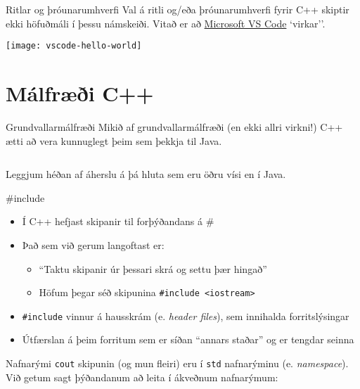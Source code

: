 \documentclass[handout]{beamer}
\begin{document}
\begin{frame}{Ritlar og þróunarumhverfi}
    Val á ritli og/eða þróunarumhverfi fyrir C++ skiptir ekki höfuðmáli í þessu námskeiði. Vitað er að \href{https://code.visualstudio.com/}{Microsoft VS Code} `virkar''.

    \begin{center}
        \texttt{[image: vscode-hello-world]}
    \end{center}
\end{frame}

\section{Málfræði C++}

\begin{frame}[fragile]{Grundvallarmálfræði}
Mikið af grundvallarmálfræði (en ekki allri virkni!) C++ ætti að vera kunnuglegt þeim sem þekkja til Java.
\begin{columns}
\end{columns}
Leggjum héðan af áherslu á þá hluta sem eru öðru vísi en í Java.
\end{frame}

\begin{frame}{\#include}
\begin{itemize}
    \item Í C++ hefjast skipanir til forþýðandans á \#
    \item Það sem við gerum langoftast er:
    \begin{itemize}
        \item ``Taktu skipanir úr þessari skrá og settu þær hingað''
        \item Höfum þegar séð skipunina \texttt{\#include <iostream>}
    \end{itemize}
    \item \texttt{\#include} vinnur á hausskrám (e. \emph{header files}), sem innihalda forritslýsingar
    \item Útfærslan á þeim forritum sem er síðan ``annars staðar'' og er tengdar seinna
\end{itemize}
\end{frame}

\begin{frame}{Nafnarými}
    \texttt{cout} skipunin (og mun fleiri) eru í \texttt{std} nafnarýminu (e. \emph{namespace}). Við getum sagt þýðandanum að leita í ákveðnum nafnarýmum:
\end{frame}
\end{document}
